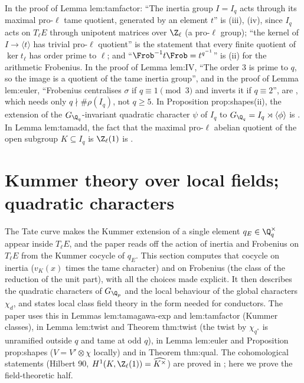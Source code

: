 \begin{paperlink}\label{pl:local:tamfactor-tame}
In the proof of Lemma lem:tamfactor: ``The inertia group $I=I_q$ acts through its maximal pro-$\ell$ tame quotient, generated by an element $t$'' is
(iii), (iv), since $I_q$ acts on $T_\ell E$ through unipotent matrices over $\Z_\ell$ (a pro-$\ell$ group); ``the kernel of
$I\to\langle t\rangle$ has trivial pro-$\ell$ quotient'' is the statement that every finite quotient of $\ker t_\ell$ has order prime to $\ell$; and
``$\Frob^{-1}t\Frob=t^{q^{-1}}$'' is (ii) for the arithmetic Frobenius. In the proof of Lemma lem:IV, ``The order $3$ is prime
to $q$, so the image is a quotient of the tame inertia group'', and in the proof of Lemma lem:euler, ``Frobenius centralises $\sigma$ if $q\equiv1\pmod3$ and inverts it if $q\equiv2$'', are
, which needs only $q\nmid\#\rho(I_q)$, not $q\ge5$. In Proposition prop:shapes(ii), the extension of the
$G_{\Q_q}$-invariant quadratic character $\psi$ of $I_q$ to $G_{\Q_q}=I_q\rtimes\langle\phi\rangle$ is . In Lemma lem:tamadd, the fact that the maximal
pro-$\ell$ abelian quotient of the open subgroup $K\subseteq I_q$ is $\Z_\ell(1)$ is .
\end{paperlink}

\section{Kummer theory over local fields; quadratic characters}\label{sec:local:kummer}

The Tate curve makes the Kummer extension of a single element $q_E\in\Q_q^\times$ appear inside $T_\ell E$, and the paper reads off the action of
inertia and Frobenius on $T_\ell E$ from the Kummer cocycle of $q_E$. This section computes that cocycle on inertia ($v_K(x)$ times the tame
character) and on Frobenius (the class of the reduction of the unit part), with all the choices made explicit. It then describes the
quadratic characters of $G_{\Q_p}$ and the local behaviour of the global characters $\chi_d$, and states local class field theory in the form
needed for conductors. The paper uses this in Lemmas lem:tamagawa-exp and lem:tamfactor (Kummer classes), in Lemma lem:twist and Theorem
thm:twist (the twist by $\chi_{q^*}$ is unramified outside $q$ and tame at odd $q$), in Lemma lem:euler and Proposition prop:shapes ($V=V'\otimes\chi$
locally) and in Theorem thm:qual. The cohomological statements (Hilbert 90, $H^1(K,\Z_\ell(1))=\widehat{K^\times}$) are proved in ;
here we prove the field-theoretic half.

